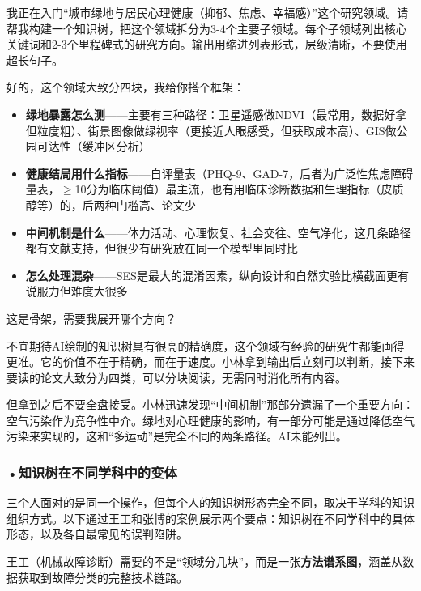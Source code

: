 \begin{userbox}
我正在入门``城市绿地与居民心理健康（抑郁、焦虑、幸福感）''这个研究领域。请帮我构建一个知识树，把这个领域拆分为3-4个主要子领域。每个子领域列出核心关键词和2-3个里程碑式的研究方向。输出用缩进列表形式，层级清晰，不要使用超长句子。
\end{userbox}

\begin{aibox}
好的，这个领域大致分四块，我给你搭个框架：

\begin{itemize}[nosep]
\item \textbf{绿地暴露怎么测}——主要有三种路径：卫星遥感做NDVI（最常用，数据好拿但粒度粗）、街景图像做绿视率（更接近人眼感受，但获取成本高）、GIS做公园可达性（缓冲区分析）
\item \textbf{健康结局用什么指标}——自评量表（PHQ-9、GAD-7，后者为广泛性焦虑障碍量表，$\geq$10分为临床阈值）最主流，也有用临床诊断数据和生理指标（皮质醇等）的，后两种门槛高、论文少
\item \textbf{中间机制是什么}——体力活动、心理恢复、社会交往、空气净化，这几条路径都有文献支持，但很少有研究放在同一个模型里同时比
\item \textbf{怎么处理混杂}——SES是最大的混淆因素，纵向设计和自然实验比横截面更有说服力但难度大很多
\end{itemize}

这是骨架，需要我展开哪个方向？
\end{aibox}

\begin{critiquebox}
不宜期待AI绘制的知识树具有很高的精确度，这个领域有经验的研究生都能画得更准。它的价值不在于精确，而在于速度。小林拿到输出后立刻可以判断，接下来要读的论文大致分为四类，可以分块阅读，无需同时消化所有内容。

但拿到之后不要全盘接受。小林迅速发现``中间机制''那部分遗漏了一个重要方向：空气污染作为竞争性中介。绿地对心理健康的影响，有一部分可能是通过降低空气污染来实现的，这和``多运动''是完全不同的两条路径。AI未能列出。
\end{critiquebox}


\subsubsection*{\textbf{•知识树在不同学科中的变体}}三个人面对的是同一个操作，但每个人的知识树形态完全不同，取决于学科的知识组织方式。以下通过王工和张博的案例展示两个要点：知识树在不同学科中的具体形态，以及各自最常见的误判陷阱。

王工（机械故障诊断）需要的不是``领域分几块''，而是一张\textbf{方法谱系图}，涵盖从数据获取到故障分类的完整技术链路。

